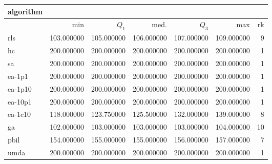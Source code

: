 \begin{tabular}{@{}l*{5}{>{{}}N{3}{0}}>{{}}N{2}{0}@{}}
\toprule
{algorithm} &  \\
\midrule
& {min} & {$Q_1$} & {med.} & {$Q_3$} & {max} & {rk}\\
\midrule
rls & 103.000000 & 105.000000 & 106.000000 & 107.000000 & 109.000000 & 9\\
hc & {\color{blue}} 200.000000 & {\color{blue}} 200.000000 & {\color{blue}} 200.000000 & {\color{blue}} 200.000000 & {\color{blue}} 200.000000 & 1\\
sa & {\color{blue}} 200.000000 & {\color{blue}} 200.000000 & {\color{blue}} 200.000000 & {\color{blue}} 200.000000 & {\color{blue}} 200.000000 & 1\\
ea-1p1 & {\color{blue}} 200.000000 & {\color{blue}} 200.000000 & {\color{blue}} 200.000000 & {\color{blue}} 200.000000 & {\color{blue}} 200.000000 & 1\\
ea-1p10 & {\color{blue}} 200.000000 & {\color{blue}} 200.000000 & {\color{blue}} 200.000000 & {\color{blue}} 200.000000 & {\color{blue}} 200.000000 & 1\\
ea-10p1 & {\color{blue}} 200.000000 & {\color{blue}} 200.000000 & {\color{blue}} 200.000000 & {\color{blue}} 200.000000 & {\color{blue}} 200.000000 & 1\\
ea-1c10 & 118.000000 & 123.750000 & 125.500000 & 132.000000 & 139.000000 & 8\\
ga & 102.000000 & 103.000000 & 103.000000 & 103.000000 & 104.000000 & 10\\
pbil & 154.000000 & 155.000000 & 155.000000 & 156.000000 & 157.000000 & 7\\
umda & {\color{blue}} 200.000000 & {\color{blue}} 200.000000 & {\color{blue}} 200.000000 & {\color{blue}} 200.000000 & {\color{blue}} 200.000000 & 1\\
\bottomrule
\end{tabular}
